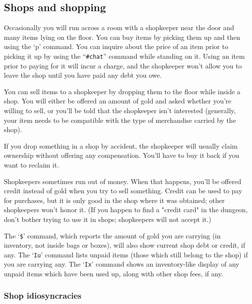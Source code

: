 \subsection*{Shops and shopping}

Occasionally you will run across a room with a shopkeeper near the door
and many items lying on the floor.  You can buy items by picking them
up and then using the `p' command.  You can inquire about the price
of an item prior to picking it up by using the ``{\tt \#chat}'' command
while standing on it.  Using an item prior to paying for it will incur a
charge, and the shopkeeper won't allow you to leave the shop until you
have paid any debt you owe.

You can sell items to a shopkeeper by dropping them to the floor while
inside a shop.  You will either be offered an amount of gold and asked
whether you're willing to sell, or you'll be told that the shopkeeper
isn't interested (generally, your item needs to be compatible with the
type of merchandise carried by the shop).

If you drop something in a shop by accident, the shopkeeper will usually
claim ownership without offering any compensation.  You'll have to buy
it back if you want to reclaim it.

Shopkeepers sometimes run out of money.  When that happens, you'll be
offered credit instead of gold when you try to sell something.  Credit
can be used to pay for purchases, but it is only good in the shop where
it was obtained; other shopkeepers won't honor it.  (If you happen to
find a "credit card" in the dungeon, don't bother trying to use it in
shops; shopkeepers will not accept it.)

The `{\tt \$}' command, which reports the amount of gold you are carrying
(in inventory, not inside bags or boxes), will also show current shop
debt or credit, if any.  The `{\tt Iu}' command lists unpaid items
(those which still belong to the shop) if you are carrying any.
The `{\tt Ix}' command shows an inventory-like display of any unpaid
items which have been used up, along with other shop fees, if any.
\subsubsection*{Shop idiosyncracies}

